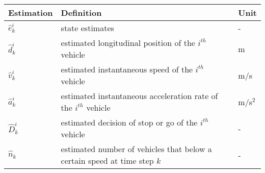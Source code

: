 \begin{longtable}{p{2.5cm}p{10cm}p{2.5cm}}
    \toprule
    \textbf{Estimation}  & Definition & Unit \\
    \midrule
    $\hat{e}_k^i$ & state estimates & - \\
    $\hat d_k^i$  & estimated longitudinal position of the $i^{th}$ vehicle & m \\
    $\hat v_k^i$  & estimated instantaneous speed of the $i^{th}$ vehicle & m/s \\
    $\hat a_k^i$  & estimated instantaneous acceleration rate of the $i^{th}$ vehicle & m/s$^2$ \\
    $\hat D_{k}^i$ & estimated decision of stop or go of the $i^{th}$ vehicle & - \\
    $\hat n_k$ & estimated number of vehicles that below a certain speed at time step $k$ & - \\
    \bottomrule
\end{longtable}

